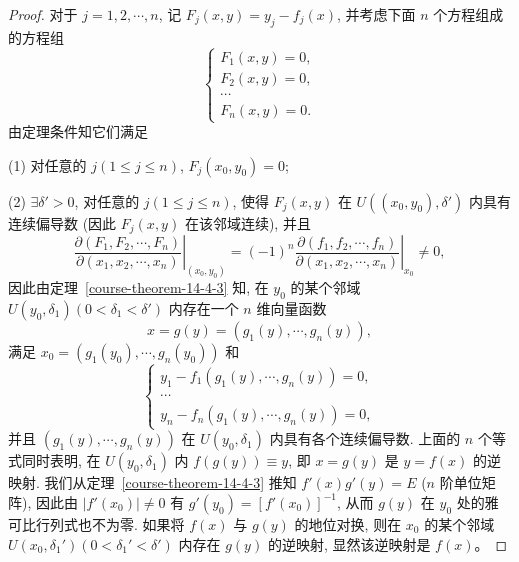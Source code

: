 \documentclass[12pt,fontset=fandol]{ctexart}
\begin{document}
\begin{proof}\quad 对于 $j=1,2,\cdots,n$, 记 $F_j(x,y)=y_j-f_j(x)$, 并考虑下面 $n$ 个方程组成的方程组
\[
  \begin{cases}
    F_1(x,y)=0,\\
    F_2(x,y)=0,\\
    \cdots\\
    F_n(x,y)=0.
  \end{cases}
\]
由定理条件知它们满足

\noindent (1) 对任意的 $j(1\leqslant j\leqslant n)$, $F_j(x_0,y_0)=0$;

\noindent (2) $\exists\delta'>0$, 对任意的 $j(1\leqslant j\leqslant n)$, 使得 $F_j(x,y)$ 在 $U((x_0,y_0),\delta')$ 内具有连续偏导数 (因此 $F_j(x,y)$ 在该邻域连续), 并且
\[
  \left.
  \frac{\partial(F_1,F_2,\cdots,F_n)}
       {\partial(x_1,x_2,\cdots,x_n)}
  \right|_{(x_0,y_0)}
  =
  (-1)^n
  \left.
  \frac{\partial(f_1,f_2,\cdots,f_n)}
       {\partial(x_1,x_2,\cdots,x_n)}
  \right|_{x_0}
  \ne0,
\]
因此由定理~\ref{course-theorem-14-4-3}  知, 在 $y_0$ 的某个邻域 $U(y_0,\delta_1)(0<\delta_1<\delta')$ 内存在一个 $n$ 维向量函数
\[
  x=g(y)=(g_1(y),\cdots,g_n(y)),
\]
满足 $x_0=(g_1(y_0),\cdots,g_n(y_0))$ 和
\[
  \begin{cases}
    y_1-f_1(g_1(y),\cdots,g_n(y))=0,\\
    \cdots\\
    y_n-f_n(g_1(y),\cdots,g_n(y))=0,
  \end{cases}
\]
并且 $(g_1(y),\cdots,g_n(y))$ 在 $U(y_0,\delta_1)$ 内具有各个连续偏导数. 上面的 $n$ 个等式同时表明, 在 $U(y_0,\delta_1)$ 内 $f(g(y))\equiv y$, 即 $x=g(y)$ 是 $y=f(x)$ 的逆映射. 我们从定理~\ref{course-theorem-14-4-3}  推知 $f'(x)g'(y)=E$ ($n$ 阶单位矩阵), 因此由 $|f'(x_0)|\ne0$ 有 $g'(y_0)=[f'(x_0)]^{-1}$, 从而 $g(y)$ 在 $y_0$ 处的雅可比行列式也不为零. 如果将 $f(x)$ 与 $g(y)$ 的地位对换, 则在 $x_0$ 的某个邻域 $U(x_0,\delta_1')(0<\delta_1'<\delta')$ 内存在 $g(y)$ 的逆映射, 显然该逆映射是 $f(x)$。


\end{proof}
\end{document}
